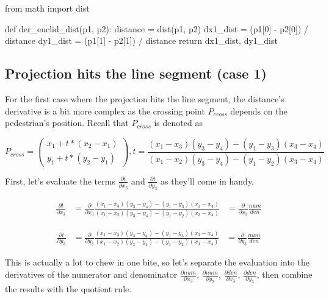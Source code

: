 \documentclass[fleqn]{article}
\begin{document}
\begin{python}
from math import dist

def der_euclid_dist(p1, p2):
    distance = dist(p1, p2)
    dx1_dist = (p1[0] - p2[0]) / distance
    dy1_dist = (p1[1] - p2[1]) / distance
    return dx1_dist, dy1_dist
\end{python}

\subsection{Projection hits the line segment (case 1)}

For the first case where the projection hits the line segment, the distance's
derivative is a bit more complex as the crossing point $P_{cross}$
depends on the pedestrian's position. Recall that $P_{cross}$ is denoted as

$$P_{cross} = \begin{pmatrix} x_1 + t * (x_2 - x_1) \\ y_1 + t * (y_2 - y_1) \end{pmatrix},
t = \frac{(x_1 - x_3) (y_3 - y_4) - (y_1 - y_3) (x_3 - x_4)}{(x_1 - x_2) (y_3 - y_4) - (y_1 - y_2) (x_3 - x_4)}$$

First, let's evaluate the terms $\frac{\partial t}{ \partial x_3}$ and $\frac{\partial t}{ \partial y_3}$
as they'll come in handy.

\begin{equation}
\begin{aligned}
    \frac{\partial t}{\partial x_3}
    &= \frac{\partial}{\partial x_3} \frac{(x_1 - x_3) (y_3 - y_4) - (y_1 - y_3) (x_3 - x_4)}{(x_1 - x_2) (y_3 - y_4) - (y_1 - y_2) (x_3 - x_4)}
    &= \frac{\partial}{\partial x_3} \frac{num}{den}
\end{aligned}
\end{equation}

\begin{equation}
\begin{aligned}
    \frac{\partial t}{\partial y_3}
    &= \frac{\partial}{\partial y_3} \frac{(x_1 - x_3) (y_3 - y_4) - (y_1 - y_3) (x_3 - x_4)}{(x_1 - x_2) (y_3 - y_4) - (y_1 - y_2) (x_3 - x_4)}
    &= \frac{\partial}{\partial y_3} \frac{num}{den}
\end{aligned}
\end{equation}

This is actually a lot to chew in one bite, so let's separate the evaluation into the derivatives
of the numerator and denominator $\frac{\partial num}{\partial x_3}$, $\frac{\partial num}{\partial y_3}$,
$\frac{\partial den}{\partial x_3}$, $\frac{\partial den}{\partial y_3}$, then combine the results
with the quotient rule.
\end{document}
